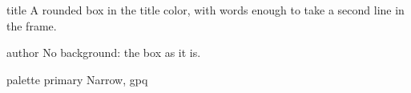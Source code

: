 \documentclass{beamer}
\begin{document}
\begin{frame}
\begin{beamercolorbox}[rounded=true,sep=4pt]{title}
A rounded box in the title color, with words enough to take a second line in the frame.
\end{beamercolorbox}
\begin{beamercolorbox}[rounded=true,center,shadow=false]{author}
No background: the box as it is.
\end{beamercolorbox}
\begin{beamercolorbox}[rounded=true,wd=5cm,colsep=2pt]{palette primary}
Narrow, gpq
\end{beamercolorbox}
\end{frame}
\end{document}
